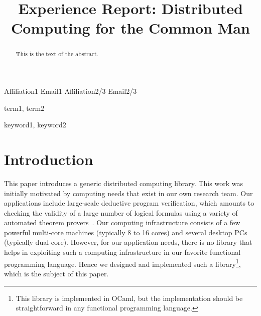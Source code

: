 \documentclass[preprint]{sigplanconf}
\newcommand{\Ocaml}{OCaml}
\begin{document}
\copyrightdata{[to be supplied]} 


\title{Experience Report: Distributed Computing for the Common Man}

           {Affiliation1}
           {Email1}
           {Affiliation2/3}
           {Email2/3}

\maketitle

\begin{abstract}
This is the text of the abstract.
\end{abstract}


\terms
term1, term2

\keywords
keyword1, keyword2

\section{Introduction}

This paper introduces a generic distributed computing library. This
work was initially motivated by computing needs that exist in our own
research team. Our applications include large-scale deductive program
verification, which amounts to checking the validity of a large number
of logical formulas using a variety of automated theorem
provers~\cite{filliatre07cav}. Our computing infrastructure consists
of a few powerful multi-core machines (typically 8 to 16 cores) and
several desktop PCs (typically dual-core). However, for our
application needs, there is no library that helps in exploiting such a
computing infrastructure in our favorite functional programming
language. Hence we designed and implemented such a
library\footnote{This library is implemented in \Ocaml, but the
  implementation should be straightforward in any functional
  programming language.}, which is the subject of this paper.
\end{document}
